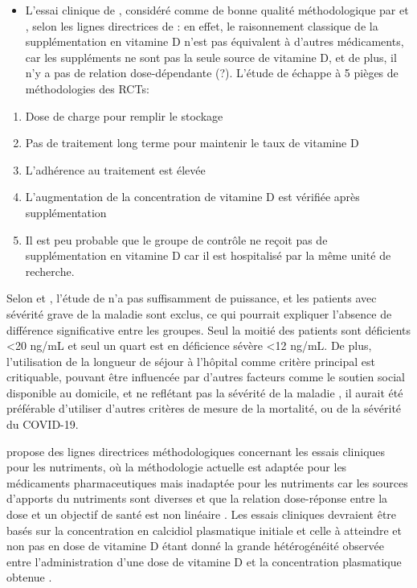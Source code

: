 \documentclass[
  a4paper,
  DIV=11,
  numbers=noendperiod,
  listof=totoc]{scrreprt}
\providecommand{\tightlist}{%
  \setlength{\itemsep}{0pt}\setlength{\parskip}{0pt}}\usepackage{longtable,booktabs,array}
\begin{document}
\begin{itemize}
\tightlist
\item
  L'essai clinique de \textcite{Murai.2021}, considéré comme de bonne
  qualité méthodologique par \textcite{Annweiler.2021} et
  \textcite{Argano.2023}, selon les lignes directrices de
  \textcite{Heaney.2014} : en effet, le raisonnement classique de la
  supplémentation en vitamine D n'est pas équivalent à d'autres
  médicaments, car les suppléments ne sont pas la seule source de
  vitamine D, et de plus, il n'y a pas de relation dose-dépendante (?).
  L'étude de \textcite{Murai.2021} échappe à 5 pièges de méthodologies
  des \acp{RCT}:
\end{itemize}

\begin{enumerate}
\def\labelenumi{\arabic{enumi})}
\tightlist
\item
  Dose de charge pour remplir le stockage
\item
  Pas de traitement long terme pour maintenir le taux de vitamine D
\item
  L'adhérence au traitement est élevée
\item
  L'augmentation de la concentration de vitamine D est vérifiée après
  supplémentation
\item
  Il est peu probable que le groupe de contrôle ne reçoit pas de
  supplémentation en vitamine D car il est hospitalisé par la même unité
  de recherche.
\end{enumerate}

Selon \textcite{Leaf.2021} et \textcite{Annweiler.2021}, l'étude de
\textcite{Murai.2021} n'a pas suffisamment de puissance, et les patients
avec sévérité grave de la maladie sont exclus, ce qui pourrait expliquer
l'absence de différence significative entre les groupes. Seul la moitié
des patients sont déficients \textless20 ng/mL et seul un quart est en
déficience sévère \textless12 ng/mL. De plus, l'utilisation de la
longueur de séjour à l'hôpital comme critère principal est critiquable,
pouvant être influencée par d'autres facteurs comme le soutien social
disponible au domicile, et ne reflétant pas la sévérité de la maladie
\autocite{Annweiler.2021}, il aurait été préférable d'utiliser d'autres
critères de mesure de la mortalité, ou de la sévérité du COVID-19.

\textcite{Heaney.2014} propose des lignes directrices méthodologiques
concernant les essais cliniques pour les nutriments, où la méthodologie
actuelle est adaptée pour les médicaments pharmaceutiques mais inadaptée
pour les nutriments car les sources d'apports du nutriments sont
diverses et que la relation dose-réponse entre la dose et un objectif de
santé est non linéaire \autocite{Grant.2022.nutrients}. Les essais
cliniques devraient être basés sur la concentration en calcidiol
plasmatique initiale et celle à atteindre et non pas en dose de vitamine
D étant donné la grande hétérogénéité observée entre l'administration
d'une dose de vitamine D et la concentration plasmatique obtenue
\autocite{Grant.2022.nutrients}.
\end{document}
